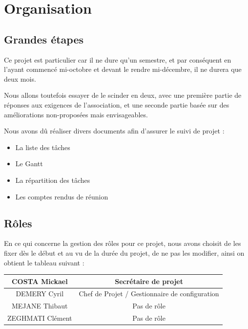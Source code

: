 \documentclass[11pt]{report}
\begin{document}
\section{Organisation}
\subsection{Grandes étapes}
Ce projet est particulier car il ne dure qu'un semestre, et par conséquent en 
l'ayant commencé mi-octobre et devant le rendre mi-décembre, il ne durera que 
deux mois. \\
\par Nous allons toutefois essayer de le scinder en deux, avec une première 
partie de réponses aux exigences de l’association, et une seconde partie basée 
sur des améliorations non-proposées mais envisageables.

Nous avons dû réaliser divers documents afin d'assurer le suivi de projet : 
\begin{itemize}
    \item La liste des tâches
    \item Le Gantt
    \item La répartition des tâches
    \item Les comptes rendus de réunion \\
\end{itemize}

\subsection{Rôles}
En ce qui concerne la gestion des rôles pour ce projet, nous avons choisit de 
les fixer dès le début et au vu de la durée du projet, de ne pas les modifier, 
ainsi on obtient le tableau suivant :  
\par
\begin{tabular}{ | c | c | }
\hline 
COSTA Mickael & Secrétaire de projet  \\ \hline 
DEMERY Cyril & Chef de Projet / Gestionnaire de configuration \\ \hline 
MEJANE Thibaut & Pas de rôle \\ \hline 
ZEGHMATI Clément & Pas de rôle \\ \hline
\end{tabular}
\end{document}
